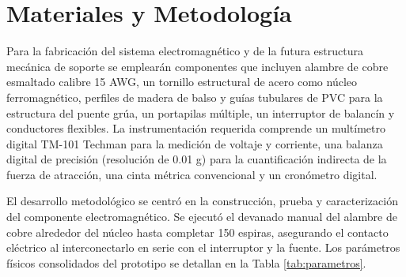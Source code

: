 \section{Materiales y Metodología}

Para la fabricación del sistema electromagnético y de la futura estructura mecánica de soporte se emplearán componentes que incluyen alambre de cobre esmaltado calibre 15 AWG, un tornillo estructural de acero como núcleo ferromagnético, perfiles de madera de balso y guías tubulares de PVC para la estructura del puente grúa, un portapilas múltiple, un interruptor de balancín y conductores flexibles. La instrumentación requerida comprende un multímetro digital TM-101 Techman para la medición de voltaje y corriente, una balanza digital de precisión (resolución de 0.01 g) para la cuantificación indirecta de la fuerza de atracción, una cinta métrica convencional y un cronómetro digital.

El desarrollo metodológico se centró en la construcción, prueba y caracterización del componente electromagnético. Se ejecutó el devanado manual del alambre de cobre alrededor del núcleo hasta completar 150 espiras, asegurando el contacto eléctrico al interconectarlo en serie con el interruptor y la fuente. Los parámetros físicos consolidados del prototipo se detallan en la Tabla \ref{tab:parametros}.

\begin{table}[H]
  \centering
  \caption{\textit{Parámetros constructivos, geométricos y de modelado del electroimán.}}
  \label{tab:parametros}
\end{table}

